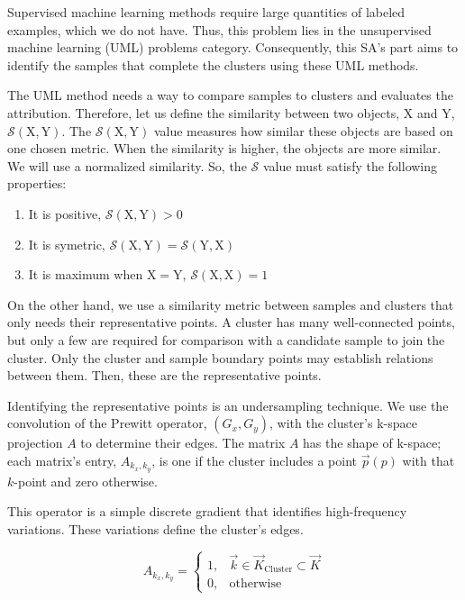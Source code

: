 \documentclass[a4paper,12pt]{report}
\begin{document}
\begin{appendices}
Supervised machine learning methods require large quantities of labeled examples, which we do not have. Thus, this problem lies in the unsupervised machine learning (UML) problems category. Consequently, this SA's part aims to identify the samples that complete the clusters using these UML methods.

The UML method needs a way to compare samples to clusters and evaluates the attribution. Therefore, let us define the similarity between two objects, $\mathrm{X}$ and $\mathrm{Y}$, $\mathcal{S}(\mathrm{X}, \mathrm{Y})$. The $\mathcal{S}(\mathrm{X}, \mathrm{Y})$ value measures how similar these objects are based on one chosen metric. When the similarity is higher, the objects are more similar. We will use a normalized similarity.
So, the $\mathcal{S}$ value must satisfy the following properties:

\begin{enumerate}
    \item It is positive, $\mathcal{S}(\mathrm{X}, \mathrm{Y}) > 0$
    \item It is symetric, $\mathcal{S}(\mathrm{X}, \mathrm{Y}) = \mathcal{S}(\mathrm{Y}, \mathrm{X})$
    \item It is maximum when $\mathrm{X}=\mathrm{Y}$, $\mathcal{S}(\mathrm{X}, \mathrm{X})=1$
\end{enumerate}

On the other hand, we use a similarity metric between samples and clusters that only needs their representative points. A cluster has many well-connected points, but only a few are required for comparison with a candidate sample to join the cluster. Only the cluster and sample boundary points may establish relations between them. Then, these are the representative points.

Identifying the representative points is an undersampling technique.
We use the convolution of the Prewitt operator, $(G_x, G_y)$, with the cluster's k-space projection $A$ to determine their edges.
The matrix $A$ has the shape of k-space; each matrix's entry, $A_{k_x,k_y}$, is one if the cluster includes a point $\vec{p}(p)$ with that $k$-point and zero otherwise.

 This operator is a simple discrete gradient that identifies high-frequency variations. These variations define the cluster's edges.


\begin{equation}
    A_{k_x,k_y} = \left\{
    \begin{array}{cc}
        1, & \vec{k} \in \vec{K}_\text{Cluster}\subset \vec{K} \\
        0, & \text{otherwise}
    \end{array}
    \right.
\end{equation}


\end{appendices}
\end{document}
